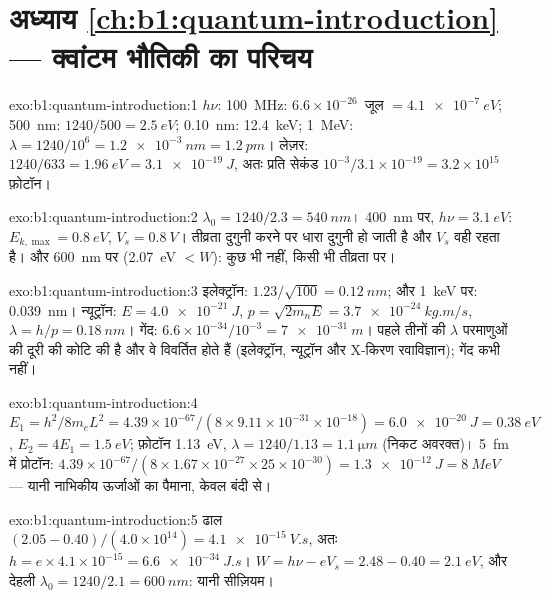 \section*{अध्याय \ref{ch:b1:quantum-introduction} --- क्वांटम भौतिकी का परिचय}

\begin{solution}{exo:b1:quantum-introduction:1}
$h\nu$: \qty{100}{MHz}: $6.6 \times 10^{-26}$~जूल $= \qty{4.1e-7}{eV}$; \qty{500}{nm}:
$1240/500 = \qty{2.5}{eV}$; \qty{0.10}{nm}: \qty{12.4}{keV}; \qty{1}{MeV}: $\lambda =
1240/10^6 = \qty{1.2e-3}{nm} = \qty{1.2}{pm}$। लेज़र: $1240/633 = \qty{1.96}{eV} =
\qty{3.1e-19}{J}$, अतः प्रति सेकंड $10^{-3}/3.1 \times 10^{-19} = 3.2 \times 10^{15}$
फ़ोटॉन।
\end{solution}

\begin{solution}{exo:b1:quantum-introduction:2}
$\lambda_0 = 1240/2.3 = \qty{540}{nm}$। \qty{400}{nm} पर, $h\nu = \qty{3.1}{eV}$:
$E_{k,\max} = \qty{0.8}{eV}$, $V_s = \qty{0.8}{V}$। तीव्रता दुगुनी करने पर
धारा दुगुनी हो जाती है और $V_s$ वही रहता है। और \qty{600}{nm} पर
(\qty{2.07}{eV} $< W$): कुछ भी नहीं, किसी भी तीव्रता पर।
\end{solution}

\begin{solution}{exo:b1:quantum-introduction:3}
इलेक्ट्रॉन: $1.23/\sqrt{100} = \qty{0.12}{nm}$; और \qty{1}{keV} पर: \qty{0.039}{nm}।
न्यूट्रॉन: $E = \qty{4.0e-21}{J}$, $p = \sqrt{2m_nE} = \qty{3.7e-24}{kg.m/s}$,
$\lambda = h/p = \qty{0.18}{nm}$। गेंद: $6.6 \times 10^{-34}/10^{-3} = \qty{7e-31}{m}$।
पहले तीनों की $\lambda$ परमाणुओं की दूरी की कोटि की है और वे विवर्तित होते
हैं (इलेक्ट्रॉन, न्यूट्रॉन और X-किरण रवाविज्ञान); गेंद कभी नहीं।
\end{solution}

\begin{solution}{exo:b1:quantum-introduction:4}
$E_1 = h^2/8m_eL^2 = 4.39 \times 10^{-67}/(8 \times 9.11 \times 10^{-31} \times 10^{-18}) =
\qty{6.0e-20}{J} = \qty{0.38}{eV}$, $E_2 = 4E_1 = \qty{1.5}{eV}$; फ़ोटॉन
\qty{1.13}{eV}, $\lambda = 1240/1.13 = \qty{1.1}{\micro m}$ (निकट अवरक्त)।
\qty{5}{fm} में प्रोटॉन: $4.39 \times 10^{-67}/(8 \times 1.67 \times 10^{-27} \times 25 \times 10^{-30}) =
\qty{1.3e-12}{J} = \qty{8}{MeV}$ --- यानी नाभिकीय ऊर्जाओं का पैमाना, केवल
बंदी से।
\end{solution}

\begin{solution}{exo:b1:quantum-introduction:5}
ढाल $(2.05 - 0.40)/(4.0 \times 10^{14}) = \qty{4.1e-15}{V.s}$, अतः $h = e \times 4.1 \times
10^{-15} = \qty{6.6e-34}{J.s}$। $W = h\nu - eV_s = 2.48 - 0.40 = \qty{2.1}{eV}$,
और देहली $\lambda_0 = 1240/2.1 = \qty{600}{nm}$: यानी सीज़ियम।
\end{solution}

